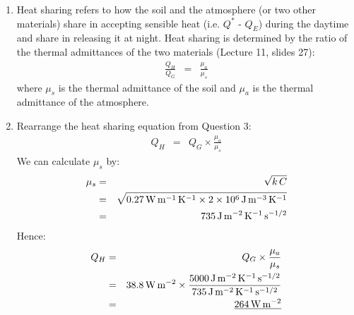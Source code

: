 \documentclass[11pt]{article}
\begin{document}
\begin{enumerate}
\item Heat sharing refers to how the soil and the atmosphere (or two other materials) share
in accepting sensible heat (i.e. $Q^{*}$ - $Q_{E}$) during the
daytime and share in releasing it at night. Heat sharing is determined by the ratio of the thermal admittances of the two materials (Lecture 11, slides 27):
\begin{eqnarray*} 
\frac{Q_H}{Q_G} &=& \frac{\mu_a}{\mu_s}
\end{eqnarray*} 
where $\mu_s$ is the thermal admittance of the soil and $\mu_a$ is the thermal admittance of the atmosphere.

\item Rearrange the heat sharing equation from Question 3:
\begin{eqnarray*} 
Q_H &=& Q_G \times \frac{\mu_a}{\mu_s} 
\end{eqnarray*} 
We can calculate $\mu_s$ by:
\begin{eqnarray*} 
\mu_s &=& \sqrt{k\,C} \\
 &=& \sqrt{0.27\,\rm{W}\,\rm{m}^{-1}\,\rm{K}^{-1} \times 2 \times 10^{6} \,\rm{J}\,\rm{m}^{-3}\,\rm{K}^{-1}} \\
 &=& 735 \,\rm{J} \,\rm{m}^{-2} \,\rm{K}^{-1} \,\rm{s}^{-1/2}
\end{eqnarray*} 
Hence:
\begin{eqnarray*} 
Q_H &=& Q_G \times \frac{\mu_a}{\mu_s} \\
&=& 38.8\,\rm{W}\,\rm{m}^{-2} \times \frac{5000 \,\rm{J} \,\rm{m}^{-2} \,\rm{K}^{-1} \,\rm{s}^{-1/2}}{735 \,\rm{J} \,\rm{m}^{-2} \,\rm{K}^{-1} \,\rm{s}^{-1/2}} \\
&=& \underline{264\,\rm{W}\,\rm{m}^{-2}}
\end{eqnarray*} 

\end{enumerate}
\end{document}

